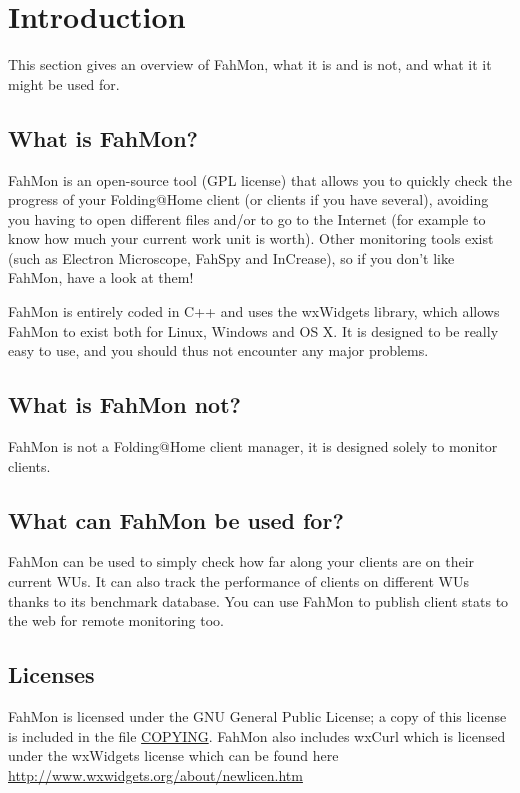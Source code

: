 \section{Introduction}

This section gives an overview of FahMon, what it is and is not, and what it
it might be used for.

\subsection{What is FahMon?}

FahMon is an open-source tool (GPL license) that allows you to quickly check the
progress of your Folding@Home client (or clients if you have several), avoiding
you having to open different files and/or to go to the Internet (for example to
know how much your current work unit is worth). Other monitoring tools exist
(such as Electron Microscope, FahSpy and InCrease), so if you don't like FahMon,
have a look at them!

FahMon is entirely coded in C++ and uses the wxWidgets library, which allows
FahMon to exist both for Linux, Windows and OS X. It is designed to be really
easy to use, and you should thus not encounter any major problems.

\subsection{What is FahMon not?}

FahMon is not a Folding@Home client manager, it is designed solely to monitor
clients.

\subsection{What can FahMon be used for?}

FahMon can be used to simply check how far along your clients are on their
current WUs. It can also track the performance of clients on different WUs
thanks to its benchmark database. You can use FahMon to publish client stats
to the web for remote monitoring too.

\subsection{Licenses}

FahMon is licensed under the GNU General Public License; a copy of this license
is included in the file \url{COPYING}.
FahMon also includes wxCurl which is licensed under the wxWidgets license which
can be found here \url{http://www.wxwidgets.org/about/newlicen.htm}

